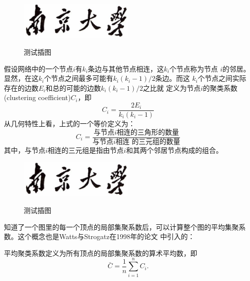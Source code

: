 \documentclass[oneside, phd]{njuthesis}
\begin{document}
\begin{definition}[局部聚类系数]


\begin{figure}[htbp]
  \centering
  \includegraphics[width= 0.5\textwidth]{njuname.eps}\\
  \caption{测试插图}\label{fig:test5}
\end{figure}

假设网络中的一个节点$i$有$k_i$条边与其他节点相连，这$k_i$个节点称为节点
$i$的邻居。显然，在这$k_i$个节点之间最多可能有$k_i(k_i-1)/2$条边。而这
$k_i$个节点之间实际存在的边数$E_i$和总的可能的边数$k_i(k_i-1)/2$之比就
定义为节点$i$的聚类系数(clustering coefficient)$C_i$，即
\begin{equation}\label{eq:clustering_coefficient}
    C_i = \frac{2E_i}{k_i(k_i-1)}
\end{equation}
从几何特性上看，上式的一个等价定义为：
\begin{equation}\label{eq:clustering_coefficient_triangle}
    C_i = \frac{\text{与节点$i$相连的三角形的数量}}{\text{与节点$i$相连
        的三元组的数量}}
\end{equation}
其中，与节点$i$相连的三元组是指由节点$i$和其两个邻居节点构成的组合。
\end{definition}

\begin{figure}[htbp]
  \centering
  \includegraphics[width= 0.5\textwidth]{njuname.eps}\\
  \caption{测试插图}\label{fig:test6}
\end{figure}

知道了一个图里的每一个顶点的局部集聚系数后，可以计算整个图的平均集聚系
数。这个概念也是Watts与Strogatz在1998年的论文
\cite{watts1998smallworld}中引入的：

\begin{definition}[平均聚类系数]
平均聚类系数定义为所有顶点的局部集聚系数的算术平均数，即
\begin{equation}
    \bar{C} = \frac{1}{n}\sum_{i=1}^{n} C_i.
\end{equation}
\end{definition}
\end{document}
